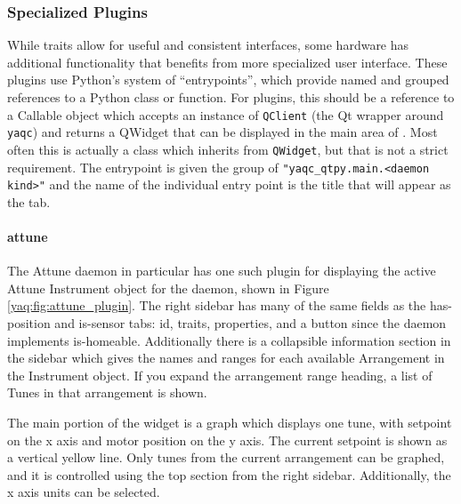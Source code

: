 \subsubsection{Specialized Plugins}

While traits allow for useful and consistent interfaces, some hardware has additional functionality that benefits from more specialized user interface.
These plugins use Python's system of ``entrypoints'', which provide named and grouped references to a Python class or function.
For \yaqcqtpy{} plugins, this should be a reference to a Callable object which accepts an instance of \texttt{QClient} (the Qt wrapper around \texttt{yaqc}) and returns a QWidget that can be displayed in the main area of \yaqcqtpy{}.
Most often this is actually a class which inherits from \texttt{QWidget}, but that is not a strict requirement.
The entrypoint is given the group of \texttt{"yaqc\_qtpy.main.<daemon kind>"} and the name of the individual entry point is the title that will appear as the tab.

\paragraph{attune}

The Attune daemon in particular has one such plugin for displaying the active Attune Instrument object for the daemon, shown in Figure \ref{yaq:fig:attune_plugin}.
The right sidebar has many of the same fields as the has-position and is-sensor tabs: id, traits, properties, and a button since the daemon implements is-homeable.
Additionally there is a collapsible information section in the sidebar which gives the names and ranges for each available Arrangement in the Instrument object.
If you expand the arrangement range heading, a list of Tunes in that arrangement is shown.

The main portion of the widget is a graph which displays one tune, with setpoint on the x axis and motor position on the y axis.
The current setpoint is shown as a vertical yellow line.
Only tunes from the current arrangement can be graphed, and it is controlled using the top section from the right sidebar.
Additionally, the x axis units can be selected.

